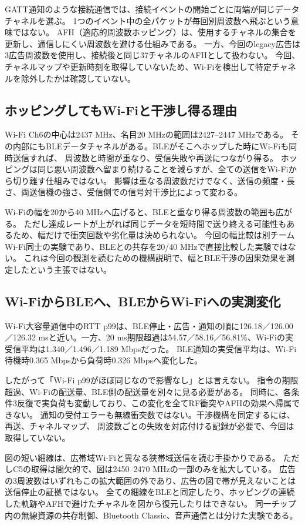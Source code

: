 \documentclass[a4paper,10pt]{ltjsarticle}
\begin{document}
GATT通知のような接続通信では、接続イベントの開始ごとに両端が同じデータチャネルを選ぶ。
1つのイベント中の全パケットが毎回別周波数へ飛ぶという意味ではない。
AFH（適応的周波数ホッピング）は、使用するチャネルの集合を更新し、通信しにくい周波数を避ける仕組みである\cite{bleAFH}。
一方、今回のlegacy広告は3広告周波数を使用し、接続後と同じ37チャネルのAFHとして扱わない。
今回、チャネルマップや更新時刻を取得していないため、Wi-Fiを検出して特定チャネルを除外したかは確認していない。

\subsection{ホッピングしてもWi-Fiと干渉し得る理由}
Wi-Fi Ch6の中心は2437 MHz、名目20 MHzの範囲は2427--2447 MHzである。
その内部にもBLEデータチャネルがある。BLEがそこへホップした時にWi-Fiも同時送信すれば、
周波数と時間が重なり、受信失敗や再送につながり得る\cite{bleAFH}。
ホッピングは同じ悪い周波数へ留まり続けることを減らすが、全ての送信をWi-Fiから切り離す仕組みではない。
影響は重なる周波数だけでなく、送信の頻度・長さ、両送信機の強さ、受信側での信号対干渉比によって変わる。

Wi-Fiの幅を20から40 MHzへ広げると、BLEと重なり得る周波数の範囲も広がる。
ただし達成レートが上がれば同じデータを短時間で送り終える可能性もあるため、幅だけで衝突回数や劣化量は決められない。
今回の幅比較は別チームWi-Fi同士の実験であり、BLEとの共存を20/40 MHzで直接比較した実験ではない。
これは今回の観測を読むための機構説明で、幅とBLE干渉の因果効果を測定したという主張ではない。

\subsection{Wi-FiからBLEへ、BLEからWi-Fiへの実測変化}
Wi-Fi大容量通信中のRTT p99は、BLE停止・広告・通知の順に126.18／126.00／126.32 msと近い。一方、20 ms期限超過は54.57／58.16／56.81\%、Wi-Fiの実受信平均は1.340／1.496／1.189 Mbpsだった。
BLE通知の実受信平均は、Wi-Fi待機時0.365 Mbpsから負荷時0.326 Mbpsへ変化した。

したがって「Wi-Fi p99がほぼ同じなので影響なし」とは言えない。
指令の期限超過、Wi-Fiの配送量、BLE側の配送量を別々に見る必要がある。
同時に、各条件3反復で実負荷も変動しており、この変化を全てRF衝突やAFHの効果へ帰属できない。
通知の受付エラーも無線衝突数ではない。干渉機構を同定するには、再送、チャネルマップ、
周波数ごとの失敗を対応付ける記録が必要で、今回は取得していない。

図の短い細線は、広帯域Wi-Fiと異なる狭帯域送信を読む手掛かりである。
ただしC5の取得は間欠的で、図は2450--2470 MHzの一部のみを拡大している。
広告の3周波数はいずれもこの拡大範囲の外であり、広告の図で帯が見えないことは送信停止の証拠ではない。
全ての細線をBLEと同定したり、ホッピングの連続した軌跡やAFHで避けたチャネルを図から復元したりはできない。
同一チップ内の無線資源の共存制御、Bluetooth Classic、音声通信とは分けた実験である。
\end{document}
